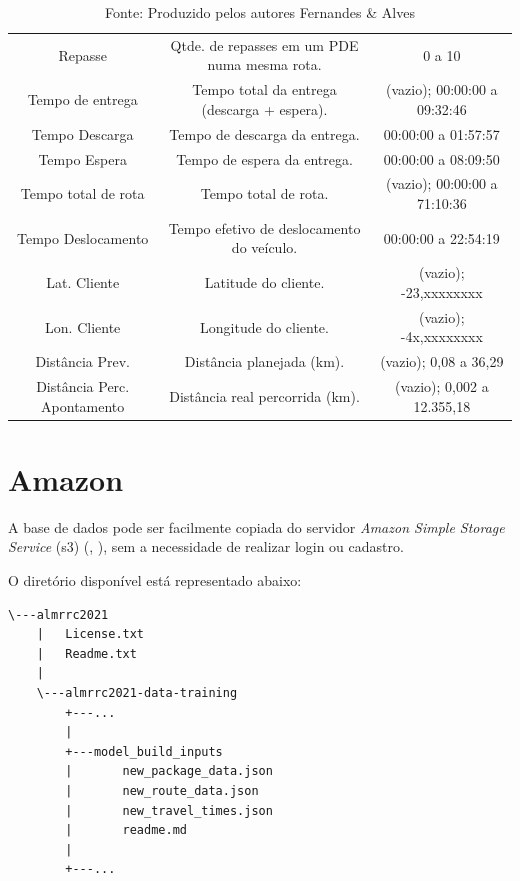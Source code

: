 \begin{table}[ht]
{\begin{tabular}{|ccc|}
    Repasse     & Qtde. de repasses em um PDE numa mesma rota. & 0 a 10\\
    Tempo de entrega        & Tempo total da entrega (descarga + espera).    & (vazio); 00:00:00 a  09:32:46 \\
    Tempo Descarga          & Tempo de descarga da entrega. & 00:00:00 a 01:57:57\\
    Tempo Espera            & Tempo de espera da entrega. & 00:00:00 a 08:09:50\\
    Tempo total de rota     & Tempo total de rota.        & (vazio); 00:00:00 a 71:10:36\\
    Tempo Deslocamento  & Tempo efetivo de deslocamento do veículo. & 00:00:00 a 22:54:19\\
    Lat. Cliente        & Latitude do cliente.  & (vazio); -23,xxxxxxxx\\
    Lon. Cliente        & Longitude do cliente. & (vazio); -4x,xxxxxxxx\\
    Distância Prev.     & Distância planejada (km).  & (vazio); 0,08 a 36,29         \\
    Distância Perc. Apontamento & Distância real percorrida (km). & (vazio); 0,002 a 12.355,18 \\ \hline
    \end{tabular}}
    \label{tab:Variaveis_BD}
    \caption*{Fonte: Produzido pelos autores Fernandes \& Alves}
\end{table}
\onehalfspacing

\section{Amazon} \label{sec:appDBAmazon}

A base de dados pode ser facilmente copiada do servidor \textit{Amazon Simple Storage Service} (s3) (, \citeyear{aws_s3}), sem a necessidade de realizar login ou cadastro.
%

O diretório disponível está representado abaixo:

\begin{lstlisting}
\---almrrc2021
    |   License.txt
    |   Readme.txt
    |
    \---almrrc2021-data-training
        +---...
        |
        +---model_build_inputs
        |       new_package_data.json
        |       new_route_data.json
        |       new_travel_times.json
        |       readme.md
        |       
        +---...
\end{lstlisting}

